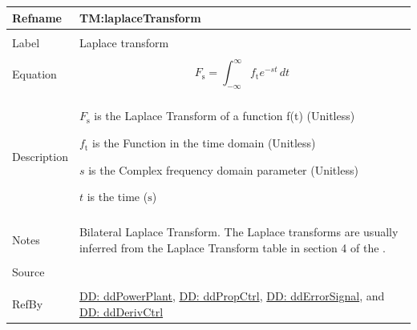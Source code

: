 \documentclass[12pt]{article}
\begin{document}
\vspace{\baselineskip}
\noindent
\begin{minipage}{\textwidth}
\begin{tabular}{>{\raggedright}p{}>{\raggedright\arraybackslash}p{}}
\toprule \textbf{Refname} & \textbf{TM:laplaceTransform}
\label{TM:laplaceTransform}
\\ \midrule \\
Label & Laplace transform
        
\\ \midrule \\
Equation & \begin{displaymath}
           {F_{\text{s}}}=\int_{-∞}^{∞}{{f_{\text{t}}} e^{-s t}}\,dt
           \end{displaymath}
\\ \midrule \\
Description & \begin{symbDescription}
              \item{${F_{\text{s}}}$ is the Laplace Transform of a function f(t) (Unitless)}
              \item{${f_{\text{t}}}$ is the Function in the time domain (Unitless)}
              \item{$s$ is the Complex frequency domain parameter (Unitless)}
              \item{$t$ is the time (${\text{s}}$)}
              \end{symbDescription}
\\ \midrule \\
Notes & Bilateral Laplace Transform. The Laplace transforms are  usually inferred from the Laplace Transform table in   section 4 of the  \cite{laplaceWiki}.
        
\\ \midrule \\
Source & \cite{laplaceWiki}
         
\\ \midrule \\
RefBy & \hyperref[DD:ddPowerPlant]{DD: ddPowerPlant}, \hyperref[DD:ddPropCtrl]{DD: ddPropCtrl}, \hyperref[DD:ddErrorSignal]{DD: ddErrorSignal}, and \hyperref[DD:ddDerivCtrl]{DD: ddDerivCtrl}
        
\\ \bottomrule
\end{tabular}
\end{minipage}
\vspace{\baselineskip}
\end{document}
